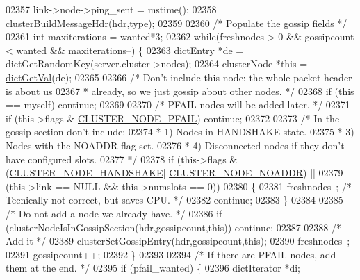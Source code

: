 \begin{DoxyCode}
{{{{{{{{{{{{{{{{{{{{{{{{{{{{{{{{{{{{{{{{02357         link->node->ping\_sent = mstime();
02358     clusterBuildMessageHdr(hdr,type);
02359 
02360     \textcolor{comment}{/* Populate the gossip fields */}
02361     \textcolor{keywordtype}{int} maxiterations = wanted*3;
02362     \textcolor{keywordflow}{while}(freshnodes > 0 && gossipcount < wanted && maxiterations--) \{
02363         dictEntry *de = dictGetRandomKey(server.cluster->nodes);
02364         clusterNode *\textcolor{keyword}{this} = \hyperlink{dict_8h_ae8d2cc391873b2bea2b87c4f80f43120}{dictGetVal}(de);
02365 
02366         \textcolor{comment}{/* Don't include this node: the whole packet header is about us}
02367 \textcolor{comment}{         * already, so we just gossip about other nodes. */}
02368         \textcolor{keywordflow}{if} (\textcolor{keyword}{this} == myself) \textcolor{keywordflow}{continue};
02369 
02370         \textcolor{comment}{/* PFAIL nodes will be added later. */}
02371         \textcolor{keywordflow}{if} (\textcolor{keyword}{this}->flags & \hyperlink{cluster_8h_a5306c1ae8988b8be0a1a02bd9162dfa1}{CLUSTER\_NODE\_PFAIL}) \textcolor{keywordflow}{continue};
02372 
02373         \textcolor{comment}{/* In the gossip section don't include:}
02374 \textcolor{comment}{         * 1) Nodes in HANDSHAKE state.}
02375 \textcolor{comment}{         * 3) Nodes with the NOADDR flag set.}
02376 \textcolor{comment}{         * 4) Disconnected nodes if they don't have configured slots.}
02377 \textcolor{comment}{         */}
02378         \textcolor{keywordflow}{if} (\textcolor{keyword}{this}->flags & (\hyperlink{cluster_8h_a60571342a067f1e5772a04b36feff6a6}{CLUSTER\_NODE\_HANDSHAKE}|
      \hyperlink{cluster_8h_a2bbed8bf0615871a01ca8b7f691b56d8}{CLUSTER\_NODE\_NOADDR}) ||
02379             (\textcolor{keyword}{this}->link == NULL && \textcolor{keyword}{this}->numslots == 0))
02380         \{
02381             freshnodes--; \textcolor{comment}{/* Tecnically not correct, but saves CPU. */}
02382             \textcolor{keywordflow}{continue};
02383         \}
02384 
02385         \textcolor{comment}{/* Do not add a node we already have. */}
02386         \textcolor{keywordflow}{if} (clusterNodeIsInGossipSection(hdr,gossipcount,\textcolor{keyword}{this})) \textcolor{keywordflow}{continue};
02387 
02388         \textcolor{comment}{/* Add it */}
02389         clusterSetGossipEntry(hdr,gossipcount,\textcolor{keyword}{this});
02390         freshnodes--;
02391         gossipcount++;
02392     \}
02393 
02394     \textcolor{comment}{/* If there are PFAIL nodes, add them at the end. */}
02395     \textcolor{keywordflow}{if} (pfail\_wanted) \{
02396         dictIterator *di;
}}}}}}}}}}}}}}}}}}}}}}}}}}}}}}}}}}}}}}}}
\end{DoxyCode}
